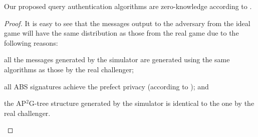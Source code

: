 \begin{lemma}\label{lemma:access-control:query-zero-knowledge}
    Our proposed query authentication algorithms are zero-knowledge according to .
\end{lemma}

\begin{proof}
    It is easy to see that the messages output to the adversary from the ideal game will have the same distribution as those from the real game due to the following reasons:
    \begin{inlineenum}
    \item all the messages generated by the simulator are generated using the same algorithms as those by the real challenger;
    \item all ABS signatures achieve the prefect privacy (according to ); and
    \item the AP$^2$G-tree structure generated by the simulator is identical to the one by the real challenger.
    \end{inlineenum}
\end{proof}
